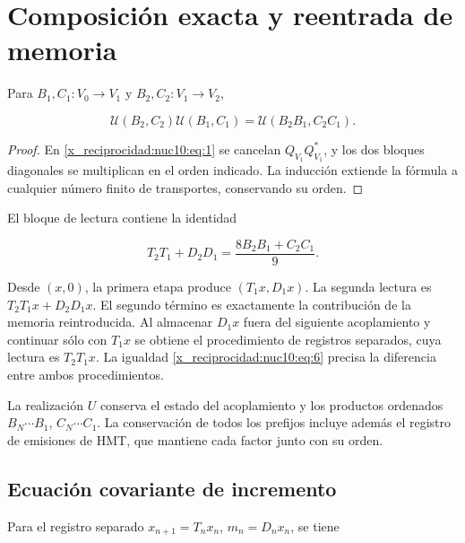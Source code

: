 \section{Composición exacta y reentrada de memoria}

Para \(B_1,C_1:V_0\to V_1\) y \(B_2,C_2:V_1\to V_2\),



\begin{equation}
\boxed{\mathcal U(B_2,C_2)\mathcal U(B_1,C_1)
=\mathcal U(B_2B_1,C_2C_1).}
\label{x_reciprocidad:nuc10:eq:5}
\end{equation}



\begin{proof}
En \eqref{x_reciprocidad:nuc10:eq:1} se cancelan \(Q_{V_1}Q_{V_1}^*\), y los dos bloques diagonales se multiplican en el orden indicado. La inducción extiende la fórmula a cualquier número finito de transportes, conservando su orden.
\end{proof}

El bloque de lectura contiene la identidad



\begin{equation}
\boxed{T_2T_1+D_2D_1=\frac{8B_2B_1+C_2C_1}{9}.}
\label{x_reciprocidad:nuc10:eq:6}
\end{equation}



Desde \((x,0)\), la primera etapa produce \((T_1x,D_1x)\). La segunda lectura es \(T_2T_1x+D_2D_1x\). El segundo término es exactamente la contribución de la memoria reintroducida. Al almacenar \(D_1x\) fuera del siguiente acoplamiento y continuar sólo con \(T_1x\) se obtiene el procedimiento de registros separados, cuya lectura es \(T_2T_1x\). La igualdad \eqref{x_reciprocidad:nuc10:eq:6} precisa la diferencia entre ambos procedimientos.

La realización \(U\) conserva el estado del acoplamiento y los productos ordenados \(B_N\cdots B_1\), \(C_N\cdots C_1\). La conservación de todos los prefijos incluye además el registro de emisiones de HMT, que mantiene cada factor junto con su orden.

\subsection{Ecuación covariante de incremento}

Para el registro separado \(x_{n+1}=T_nx_n\), \(m_n=D_nx_n\), se tiene



